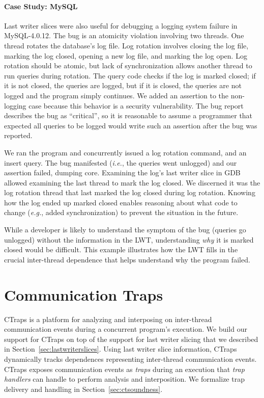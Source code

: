 \documentclass[preprint,9pt]{sigplanconf}
\newcommand{\ctraps}{CTraps\xspace}
\newcommand{\lwt}{LWT\xspace}
\begin{document}
\paragraph{Case Study: MySQL}
Last writer slices were also useful for debugging a logging system failure in
MySQL-4.0.12.  The bug is an atomicity violation involving two threads.  One
thread rotates the database's log file.  Log rotation involves closing the log
file, marking the log closed, opening a new log file, and marking the log open.
Log rotation should be atomic, but lack of synchronization allows another
thread to run queries during rotation.  The query code checks if the log is
marked closed; if it is not closed, the queries are logged, but if it is
closed, the queries are not logged and the program simply continues.  We added
an assertion to the non-logging case because this behavior is a security
vulnerability.  The bug report describes the bug as ``critical'', so it is
reasonable to assume a programmer that expected all queries to be logged would
write such an assertion after the bug was reported.

We ran the program and concurrently issued a log rotation command, and an
insert query.  The bug manifested ({\em i.e.}, the queries went unlogged) and
our assertion failed, dumping core.  Examining the log's last writer slice in
GDB allowed examining the last thread to mark the log closed.  We discerned it
was the log rotation thread that last marked the log closed during log
rotation.  Knowing how the log ended up marked closed enables reasoning about
what code to change ({\em e.g.}, added synchronization) to prevent the
situation in the future.

While a developer is likely to understand the symptom of the bug (queries go
unlogged) without the information in the \lwt, understanding {\em why} it is marked closed would be
difficult.  This example illustrates how the \lwt fills in the crucial inter-thread
dependence that helps understand why the program failed.



\section{Communication Traps}
\label{sec:ctraps}

\ctraps is a platform for analyzing and interposing on inter-thread
communication events during a concurrent program's execution.  We build our
support for \ctraps on top of the support for last writer slicing that we
described in Section~\ref{sec:lastwriterslices}.  Using last writer slice
information, \ctraps dynamically tracks dependences representing inter-thread
communication events. \ctraps exposes communication events as {\em traps}
during an execution that {\em trap handlers} can handle to perform analysis
and interposition.  We formalize trap delivery and handling in
Section~\ref{sec:ctsoundness}.
\end{document}
